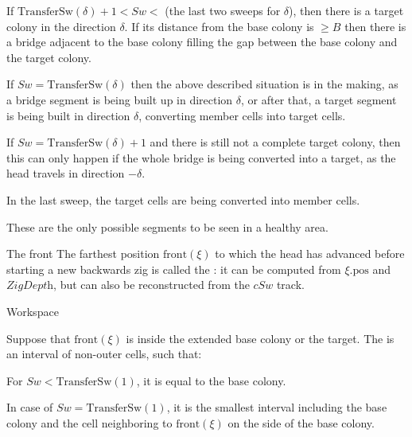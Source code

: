 \documentclass[12pt]{memoir}
\newcommand{\fld}[1]{\ensuremath{\textit{#1}}}
\def\B{B}
\newcommand{\pos}{\mathrm{pos}}
\newcommand{\Sweep}{\fld{Sw}}
\newcommand{\cSweep}{\fld{cSw}}
\newcommand{\ZigDepth}{\fld{ZigDepth}}
\newcommand{\front}{\mathrm{front}}
\newcommand{\TransferSw}{\mathrm{TransferSw}}
\begin{document}
\begin{definition}
\begin{flushdescription}
\begin{bullets}
        \item If \( \TransferSw(\delta) +1 < \Sweep <  \) (the last two sweeps for \( \delta \)),
          then there is a target colony in the direction \( \delta \).
          If its distance from the base colony is \( \ge\B \) then there is a 
          bridge adjacent to the base colony filling the gap between the 
          base colony and the target colony.

        \item If \( \Sweep = \TransferSw(\delta) \) then the above 
          described situation is in the making, as
          a bridge segment is being built up in direction \( \delta \), or after that,
          a target segment is being built in direction \( \delta \), converting member cells into target cells.
          
        \item If \( \Sweep = \TransferSw(\delta) +1 \) and there is still not a complete target colony,
          then this can only happen if the whole bridge is being converted into a target, 
          as the head travels in direction \( -\delta \).

         \item In the last sweep, the target cells are being converted into member cells.
        \end{bullets}
        These are the only possible segments to be seen in a healthy area.
        
    \item [The front] 
    The farthest position \( \front(\xi) \) to which the head has 
    advanced before starting a new backwards zig is called the :
    it can be computed from \( \xi.\pos \) and \( \ZigDepth \), but can also be reconstructed from
    the \( \cSweep \) track.

     \item[Workspace]

       \begin{sloppypar}
          Suppose that \( \front(\xi) \) is inside the extended base colony or the target.
          The  is an interval of non-outer cells, such that:         
       \end{sloppypar}

        \begin{bullets}
            \item For \( \Sweep < \TransferSw(1) \),
                  it is equal to the base colony.
            \item In case of \( \Sweep = \TransferSw(1) \),
                  it is the smallest interval including
                  the base colony and the cell neighboring to
                  \( \front(\xi) \) on the side of the base colony.


\end{bullets}
\end{flushdescription}
\end{definition}
\end{document}
